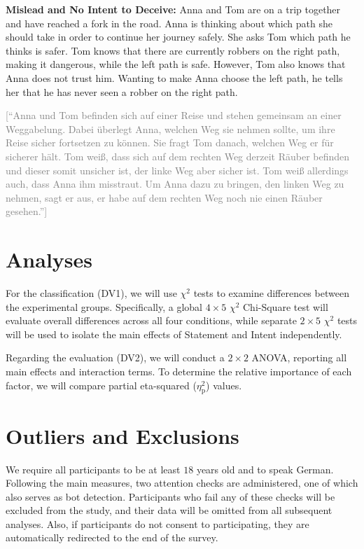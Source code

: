 \documentclass[scrarticle]{scrartcl}
\begin{document}
\vspace{0.75em}
\noindent \textsf{\textbf{Mislead and No Intent to Deceive:}}
Anna and Tom are on a trip together and have reached a fork in the road.
Anna is thinking about which path she should take in order to continue her journey safely.
She asks Tom which path he thinks is safer.
Tom knows that there are currently robbers on the right path, making it dangerous, while the left path is safe.
However, Tom also knows that Anna does not trust him.
Wanting to make Anna choose the left path, he tells her that he has never seen a robber on the right path.

\vspace{0.75em}
\noindent\textcolor{gray}{[\enquote{Anna und Tom befinden sich auf einer Reise und stehen gemeinsam an einer Weggabelung.
Dabei überlegt Anna, welchen Weg sie nehmen sollte, um ihre Reise sicher fortsetzen zu können.
Sie fragt Tom danach, welchen Weg er für sicherer hält.
Tom weiß, dass sich auf dem rechten Weg derzeit Räuber befinden und dieser somit unsicher ist, der linke Weg aber sicher ist.
Tom weiß allerdings auch, dass Anna ihm misstraut.
Um Anna dazu zu bringen, den linken Weg zu nehmen, sagt er aus, er habe auf dem rechten Weg noch nie einen Räuber gesehen.}]}


\section{Analyses}
For the classification (DV1), we will use $\chi^2$ tests to examine differences between the experimental groups.
Specifically, a global $4 \times 5$ $\chi^2$ Chi-Square test will evaluate overall differences across all four conditions, while separate $2 \times 5$ $\chi^2$ tests will be used to isolate the main effects of Statement and Intent independently.

Regarding the evaluation (DV2), we will conduct a $2 \times 2$ ANOVA, reporting all main effects and interaction terms.
To determine the relative importance of each factor, we will compare partial eta-squared ($\eta_{\text{p}}^{2}$) values.


\section{Outliers and Exclusions}
We require all participants to be at least $18$ years old and to speak German.
Following the main measures, two attention checks are administered, one of which also serves as bot detection.
Participants who fail any of these checks will be excluded from the study, and their data will be omitted from all subsequent analyses.
Also, if participants do not consent to participating, they are automatically redirected to the end of the survey.
\end{document}
